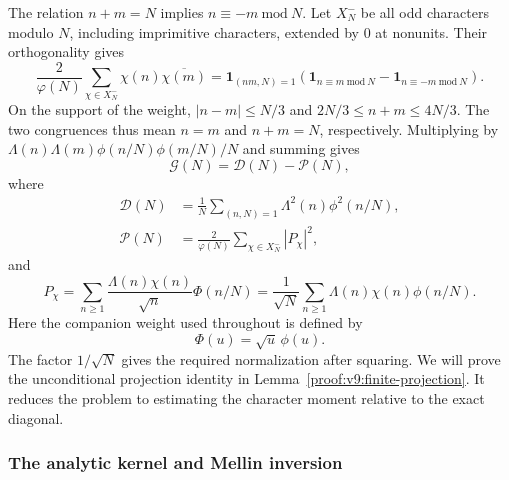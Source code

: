 \documentclass[12pt,a4paper]{amsart}
\numberwithin{equation}{section}
\def\le{\leqslant}
\def\ge{\geqslant}
\theoremstyle{plain}
\theoremstyle{definition}
\theoremstyle{remark}
\begin{document}
The relation $n+m=N$ implies $n\equiv-m\ \mathrm{mod}\ N$. Let $X_N^-$ be
all odd characters modulo $N$, including imprimitive characters,
extended by $0$ at nonunits. Their orthogonality gives
\begin{equation}\label{gb:orthogonality}
 \frac2{\varphi(N)}\sum_{\chi\in X_N^-}
          \chi(n)\overline{\chi(m)}
 =\mathbf1_{(nm,N)=1}
    \left(\mathbf1_{n\equiv m\ \mathrm{mod}\ N}
               -\mathbf1_{n\equiv-m\ \mathrm{mod}\ N}\right).
\end{equation}
On the support of the weight, $|n-m|\le N/3$ and
$2N/3\le n+m\le4N/3$. The two congruences thus mean $n=m$
and $n+m=N$, respectively. Multiplying by
$\Lambda(n)\Lambda(m)\phi(n/N)\phi(m/N)/N$ and summing gives
\begin{equation}\label{gb:projection-identity}
 \mathcal G(N)=\mathcal D(N)-\mathcal P(N),
\end{equation}
where
\begin{equation}\label{gb:finite-moments}
 \begin{aligned}
 \mathcal D(N)&=\frac1N\sum_{(n,N)=1}\Lambda^2(n)\phi^2(n/N),\\
 \mathcal P(N)&=\frac2{\varphi(N)}
       \sum_{\chi\in X_N^-}|P_\chi|^2,
 \end{aligned}
\end{equation}
and
\begin{equation}\label{gb:prime-polynomial}
 P_\chi=\sum_{n\ge1}\frac{\Lambda(n)\chi(n)}{\sqrt n}\Phi(n/N)
        =\frac1{\sqrt N}\sum_{n\ge1}\Lambda(n)\chi(n)\phi(n/N).
\end{equation}
Here the companion weight used throughout is defined by
\begin{equation}\label{eq:fixed-goldbach-weight}
 \Phi(u)=\sqrt u\,\phi(u).
\end{equation}
The factor $1/\sqrt N$ gives the required normalization after
squaring. We will prove the unconditional projection identity in
Lemma~\ref{proof:v9:finite-projection}. It reduces the problem
to estimating the character moment relative to the exact diagonal.

\subsubsection{The analytic kernel and Mellin inversion}
\end{document}
